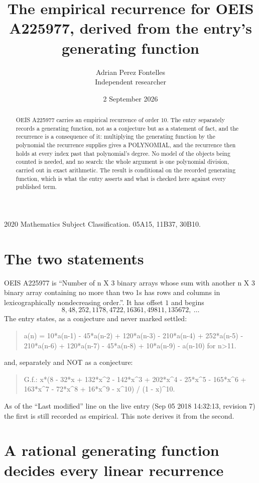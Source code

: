 \documentclass[11pt,a4paper]{article}
\title{The empirical recurrence for OEIS A225977, derived from the entry's generating function}
\author{Adrian Perez Fontelles\\ \small Independent researcher}
\date{2 September 2026}
\theoremstyle{plain}
\theoremstyle{definition}
\begin{document}
\maketitle

\begin{abstract}
OEIS A225977 carries an empirical recurrence of order $10$. The entry separately records a
generating function, not as a conjecture but as a statement of fact, and the recurrence is a
consequence of it: multiplying the generating function by the polynomial the recurrence
supplies gives a POLYNOMIAL, and the recurrence then holds at every index past that
polynomial's degree. No model of the objects being counted is needed, and no search: the
whole argument is one polynomial division, carried out in exact arithmetic. The result is
conditional on the recorded generating function, which is what the entry asserts and what is
checked here against every published term.
\end{abstract}

\noindent\small 2020 Mathematics Subject Classification. 05A15, 11B37, 30B10.\normalsize

\section{The two statements}

OEIS A225977 is ``Number of n X 3 binary arrays whose sum with another n X 3 binary array containing no more than two 1s has rows and columns in lexicographically nondecreasing order.''. It has offset $1$ and begins
\[
8, 48, 252, 1178, 4722, 16361, 49811, 135672,\ \dots
\]
The entry states, as a conjecture and never marked settled:
\begin{quote}
a(n) = 10*a(n-1) - 45*a(n-2) + 120*a(n-3) - 210*a(n-4) + 252*a(n-5) - 210*a(n-6) + 120*a(n-7) - 45*a(n-8) + 10*a(n-9) - a(n-10) for n>11.
\end{quote}
and, separately and NOT as a conjecture:
\begin{quote}
G.f.: x*(8 - 32*x + 132*x\^{}2 - 142*x\^{}3 + 202*x\^{}4 - 25*x\^{}5 - 165*x\^{}6 + 163*x\^{}7 - 72*x\^{}8 + 16*x\^{}9 - x\^{}10) / (1 - x)\^{}10.
\end{quote}
As of the ``Last modified'' line on the live entry (Sep 05 2018 14:32:13, revision 7) the first is still
recorded as empirical. This note derives it from the second.

\section{A rational generating function decides every linear recurrence}
\end{document}
